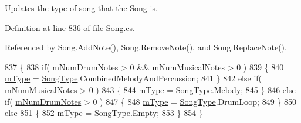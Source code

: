 Updates the \hyperlink{group___song_enums_gae681a1f001333e39fc1cb4fea97bfe1b}{type of song} that the \hyperlink{class_song}{Song} is. 



Definition at line 836 of file Song.\+cs.



Referenced by Song.\+Add\+Note(), Song.\+Remove\+Note(), and Song.\+Replace\+Note().


\begin{DoxyCode}
837     \{
838         \textcolor{keywordflow}{if}( \hyperlink{group___song_priv_var_ga3dbce17d96b434d4492280c39cff1778}{mNumDrumNotes} > 0 && \hyperlink{group___song_priv_var_gaf55b4fd2df0457ba1306a75ac3fdc8b1}{mNumMusicalNotes} > 0 )
839         \{
840             \hyperlink{group___song_priv_var_gaf3b9d0f461522324f897b746311b43c5}{mType} = \hyperlink{group___song_enums_gae681a1f001333e39fc1cb4fea97bfe1b}{SongType}.CombinedMelodyAndPercussion;
841         \}
842         \textcolor{keywordflow}{else} \textcolor{keywordflow}{if}( \hyperlink{group___song_priv_var_gaf55b4fd2df0457ba1306a75ac3fdc8b1}{mNumMusicalNotes} > 0 )
843         \{
844             \hyperlink{group___song_priv_var_gaf3b9d0f461522324f897b746311b43c5}{mType} = \hyperlink{group___song_enums_gae681a1f001333e39fc1cb4fea97bfe1b}{SongType}.Melody;
845         \}
846         \textcolor{keywordflow}{else} \textcolor{keywordflow}{if}( \hyperlink{group___song_priv_var_ga3dbce17d96b434d4492280c39cff1778}{mNumDrumNotes} > 0 )
847         \{
848             \hyperlink{group___song_priv_var_gaf3b9d0f461522324f897b746311b43c5}{mType} = \hyperlink{group___song_enums_gae681a1f001333e39fc1cb4fea97bfe1b}{SongType}.DrumLoop;
849         \}
850         \textcolor{keywordflow}{else}
851         \{
852             \hyperlink{group___song_priv_var_gaf3b9d0f461522324f897b746311b43c5}{mType} = \hyperlink{group___song_enums_gae681a1f001333e39fc1cb4fea97bfe1b}{SongType}.Empty;
853         \}
854     \}
\end{DoxyCode}

